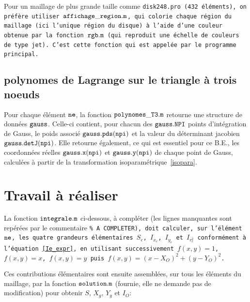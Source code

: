 \documentclass[a4paper, 10pt]{article}
\newcommand{\matlabscript}[2]
  {\begin{itemize}\item[]\end{itemize}}
\begin{document}
Pour un maillage de plus grande taille comme \tt{disk248.pro}\rm{} (432 éléments), on préfère
utiliser $\tt{affichage\_region.m}\rm$, qui colorie chaque région du maillage (ici l'unique
région du disque) à l'aide d'une couleur obtenue par la fonction $\tt{rgb.m}\rm$ (qui reproduit
une échelle de couleurs de type \tt{jet}\rm). C'est cette fonction qui est appelée par le
programme principal.


\subsection {polynomes de Lagrange sur le triangle à trois noeuds}

Pour chaque élément $\tt{ne} \rm$, la fonction $\tt{polynomes\_T3.m} \rm$ retourne une structure
de données $\tt{gauss} \rm$. Celle-ci contient, pour chacun des $\tt{gauss.NPI} \rm$ points
d'intégration de Gauss, le poids associé $\tt{gauss.pds(npi)}\rm$ et la valeur du déterminant
jacobien $\tt{gauss.detJ(npi)}\rm$. Elle retourne également, ce qui est essentiel pour ce B.E.,
les coordonnées réelles $\tt{gauss.x(npi)}\rm$ et $\tt{gauss.y(npi)}\rm$ de chaque point de
Gauss, calculées à partir de la transformation isoparamétrique~\eqref{isopara}.


\section {Travail à réaliser}

La fonction $\tt{integrale.m}\rm$ ci-dessous, à compléter (les lignes manquantes sont repérées
par le commentaire \tt{\% A COMPLETER}\rm), doit calculer, sur l'élément $\tt{ne}\rm$, les quatre
grandeurs élémentaires $S_e$, $I_{x_e}$, $I_{y_e}$ et $I_{r^2_e}$ conformément à
l'équation~\eqref{Ie_expr}, en utilisant successivement $f(x,y)=1$, $f(x,y)=x$, $f(x,y)=y$ puis
$f(x,y)=(x-X_O)^2+(y-Y_O)^2$.


Ces contributions élémentaires sont ensuite assemblées, sur tous les éléments du maillage, par
la fonction $\tt{solution.m}\rm$ (fournie, elle ne demande pas de modification) pour obtenir
$S$, $X_g$, $Y_g$ et $I_O$:

\end{document}
